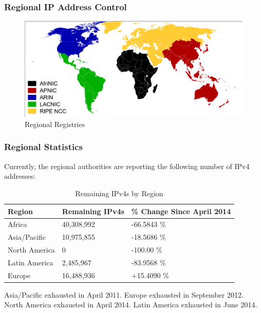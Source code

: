 \documentclass[aspectratio=169]{beamer}
\begin{document}
\begin{frame}
\frametitle{Regional IP Address Control}
\begin{figure}
\includegraphics[scale=0.44]{../artifacts/regional-registries.pdf}
\caption{Regional Registries}
\label{fig:regional}
\end{figure}
\end{frame}

\begin{frame}
\frametitle{Regional Statistics}
Currently, the regional authorities are reporting the following number of IPv4 addresses: \cite{he-stats}
\begin{table}
\begin{tabular}{|l|l|l|}
\hline
\textbf{Region} & \textbf{Remaining IPv4s} & \textbf{\% Change Since April 2014}\\
\hline
Africa & 40,308,992 & -66.5843 \%\\
\hline
Asia/Pacific & 10,975,855 & -18.5686 \%\\
\hline
North America & 0 & -100.00 \%\\
\hline
Latin America & 2,485,967 & -83.9568 \%\\
\hline
Europe & 16,488,936 & +15.4090 \%\\
\hline
\end{tabular}
\caption{Remaining IPv4s by Region}
\label{tbl:remaining}
\end{table}
Asia/Pacific exhausted in April 2011. Europe exhausted in September 2012. North America exhausted in April 2014. \cite{arin} Latin America exhausted in June 2014. \cite{lacnic}
\end{frame}
\end{document}
